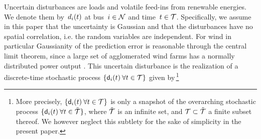 \documentclass[final,3p,times,twocolumn]{elsarticle}  %
\begin{document}
Uncertain disturbances are loads and volatile feed-ins from renewable energies. We denote them by~$d_i(t)$ at bus~$i \in \mathcal{N}$ and time~$t \in \mathcal{T}$.
Specifically, we assume in this paper that the uncertainty is Gaussian and that the disturbances have no spatial correlation, i.e. the random variables are independent. For wind in particular Gaussianity of the prediction error is reasonable through the central limit theorem, since a large set of agglomerated wind farms has a normally distributed power output \cite{hemmati_stochastic_2016}.  This uncertain disturbance
is the realization of a discrete-time stochastic process $\{ \mathsf{d}_i(t) \: \forall t \in \mathcal{T} \}$ given by\,\footnote{More precisely, $\{ \mathsf{d}_i(t) \: \forall t \in \mathcal{T} \}$ is only a snapshot of the overarching stochastic process $\{ \mathsf{d}_i(t) \: \forall t \in \tilde{\mathcal{T}} \}$, where $\tilde{\mathcal{T}}$ is an infinite set, and $\mathcal{T} \subset \tilde{\mathcal{T}}$ a finite subset thereof.
We however neglect this subtlety for the sake of simplicity in the present paper.}
\end{document}

